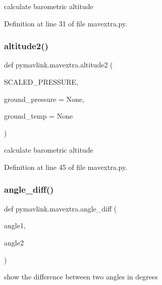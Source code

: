 \begin{DoxyVerb}calculate barometric altitude\end{DoxyVerb}
 

Definition at line 31 of file mavextra.\+py.

\mbox{\label{namespacepymavlink_1_1mavextra_af5dcda30d85d910c246199de4189750f}} 
\subsubsection{\texorpdfstring{altitude2()}{altitude2()}}
{\footnotesize\ttfamily def pymavlink.\+mavextra.\+altitude2 (\begin{DoxyParamCaption}\item[{}]{S\+C\+A\+L\+E\+D\+\_\+\+P\+R\+E\+S\+S\+U\+RE,  }\item[{}]{ground\+\_\+pressure = {\ttfamily None},  }\item[{}]{ground\+\_\+temp = {\ttfamily None} }\end{DoxyParamCaption})}

\begin{DoxyVerb}calculate barometric altitude\end{DoxyVerb}
 

Definition at line 45 of file mavextra.\+py.

\mbox{\label{namespacepymavlink_1_1mavextra_a4c518cade632dd29062b09b919c4f9e1}} 
\subsubsection{\texorpdfstring{angle\_diff()}{angle\_diff()}}
{\footnotesize\ttfamily def pymavlink.\+mavextra.\+angle\+\_\+diff (\begin{DoxyParamCaption}\item[{}]{angle1,  }\item[{}]{angle2 }\end{DoxyParamCaption})}

\begin{DoxyVerb}show the difference between two angles in degrees\end{DoxyVerb}
 

